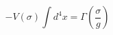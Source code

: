 \begin{equation}  \label{25}
-V(\sigma)\int d^{4}x=\Gamma\left(\frac{\sigma}{g}\right)
\end{equation}

